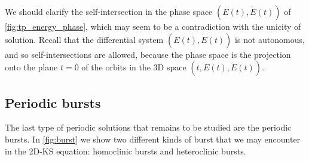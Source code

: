 \documentclass[twoside]{article}
\begin{document}
We should clarify the self-intersection in the phase space $(E(t), \dot{E}(t))$ of \cref{fig:tp_energy_phase}, which may seem to be a contradiction with the unicity of solution. Recall that the differential system $(E(t), \dot{E}(t))$ is not autonomous, and so self-intersections are allowed, because the phase space is the projection onto the plane $t=0$ of the orbits in the 3D space $(t,E(t), \dot{E}(t))$.
\subsection{Periodic bursts}\label{sec:periodic_bursts}
The last type of periodic solutions that remains to be studied are the periodic bursts. In \cref{fig:burst} we show two different kinds of burst that we may encounter in the 2D-KS equation: homoclinic bursts and heteroclinic bursts.
\end{document}
